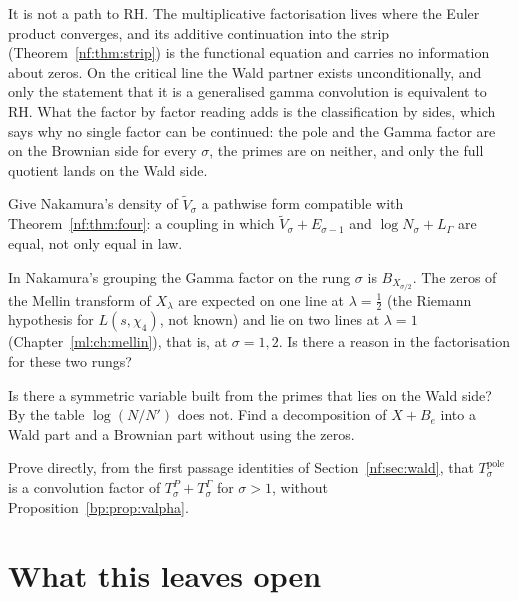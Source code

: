 It is not a path to RH. The multiplicative factorisation lives where the Euler product converges, and its additive continuation into the strip (Theorem~\ref{nf:thm:strip}) is the functional equation and carries no information about zeros. On the critical line the Wald partner exists unconditionally, and only the statement that it is a generalised gamma convolution is equivalent to RH. What the factor by factor reading adds is the classification by sides, which says why no single factor can be continued: the pole and the Gamma factor are on the Brownian side for every $\sigma$, the primes are on neither, and only the full quotient lands on the Wald side.

\begin{problem}
Give Nakamura's density of $\tilde V_\sigma$ a pathwise form compatible with Theorem~\ref{nf:thm:four}: a coupling in which $\tilde V_\sigma+E_{\sigma-1}$ and $\log N_\sigma+L_\Gamma$ are equal, not only equal in law.
\end{problem}
\begin{problem}
In Nakamura's grouping the Gamma factor on the rung $\sigma$ is $B_{X_{\sigma/2}}$. The zeros of the Mellin transform of $X_\lambda$ are expected on one line at $\lambda=\frac12$ (the Riemann hypothesis for $L(s,\chi_4)$, not known) and lie on two lines at $\lambda=1$ (Chapter~\ref{ml:ch:mellin}), that is, at $\sigma=1,2$. Is there a reason in the factorisation for these two rungs?
\end{problem}
\begin{problem}
Is there a symmetric variable built from the primes that lies on the Wald side? By the table $\log(N/N')$ does not. Find a decomposition of $X+B_e$ into a Wald part and a Brownian part without using the zeros.
\end{problem}
\begin{problem}
Prove directly, from the first passage identities of Section~\ref{nf:sec:wald}, that $T^{\mathrm{pole}}_\sigma$ is a convolution factor of $T^P_\sigma+T^\Gamma_\sigma$ for $\sigma>1$, without Proposition~\ref{bp:prop:valpha}.
\end{problem}

\section{What this leaves open}\label{n:sec:path}

